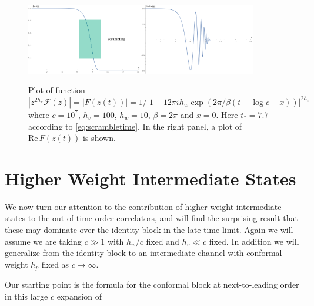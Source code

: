 \documentclass{brownthesis}
\begin{document}
\begin{figure}
\includegraphics[width=0.45\textwidth]{Fz-t-plot}\qquad{}\includegraphics[width=0.45\textwidth]{scrambling-plot-real}
\caption{\label{fig:scrambling-plot}Plot of function $|z^{2h_{v}}\mathcal{F}(z)|=|F(z(t))|=1/\left|1-12\pi ih_{w}\exp\left(2\pi/\beta\left(t-\log c-x\right)\right)\right|^{2h_{v}}$
where $c=10^{7}$, $h_{v}=100$, $h_{w}=10$, $\beta=2\pi$ and $x=0$.
Here $t_{*}=7.7$ according to \eqref{eq:scrambletime}. In the right
panel, a plot of $\mathrm{Re}\,F(z(t))$ is shown.}
\end{figure}

\section{Higher Weight Intermediate States}

We now turn our attention to the contribution of higher weight intermediate
states to the out-of-time order correlators, and will find the surprising
result that these may dominate over the identity block in the late-time
limit. Again we will assume we are taking $c\gg1$ with $h_{w}/c$
fixed and $h_{v}\ll c$ fixed. In addition we will generalize from
the identity block to an intermediate channel with conformal weight
$h_{p}$ fixed as $c\to\infty$.

Our starting point is the formula for the conformal block at next-to-leading
order in this large $c$ expansion of \cite{Fitzpatrick:2015zha}
\end{document}
